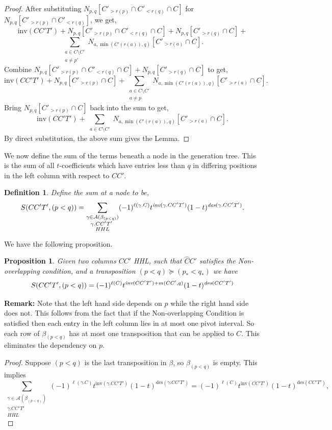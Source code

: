 \documentclass[11pt]{amsart}
\newtheorem{prop}{Proposition}[section]
\newtheorem{definition}{Definition}[section]
\begin{document}
{\begin{proof}
\newline\indent After substituting $N_{p,q}[C'_{>r(p)}\cap C'_{<r(q)}\cap C]$ for $N_{p,q}[C'_{>r(p)}\cap C'_{<r(q)}]$, we get,
\[
\text{inv}(CC'T')+N_{p,q}[C'_{>r(p)}\cap C'_{<r(q)}\cap C]+N_{p,q}[C'_{>r(q)}\cap C]+
\]
\[
\sum_{\substack{a\in C\setminus C'\\a\neq p'}}N_{a,\min(C'(r(a)),q)}[C'_{>r(a)}\cap C].
\]
Combine $N_{p,q}[C'_{>r(p)}\cap C'_{<r(q)}\cap C]+N_{p,q}[C'_{>r(q)}\cap C]$ to get, 
\[
\text{inv}(CC'T')+N_{p,q}[C'_{>r(p)}\cap C]+
\sum_{\substack{a\in C\setminus C'\\a\neq p}}N_{a,\min(C'(r(a)),q)}[C'_{>r(a)}\cap C].
\]
Bring $N_{p,q}[C'_{>r(p)}\cap C]$ back into the sum to get,
\[
\text{inv}(CC'T')+
\sum_{\substack{a\in C\setminus C'}}N_{a,\min(C'(r(a)),q)}[C'_{>r(a)}\cap C].
\]
By direct substitution, the above sum gives the Lemma.
\end{proof}
We now define the sum of the terms beneath a node in the generation tree. This is the sum of all $t$-coefficients which have entries less than $q$ in differing positions in the left column with respect to $CC'$.
\begin{definition} Define the sum at a node to be,
\[
S(CC'T',(p<q))=\sum_{\substack{\gamma \in \mathcal{A}(\beta_{(p<q)})\\ \gamma.CC'T'\text{ }\\ HHL}}(-1)^{\ell(\gamma.C)}t^{\emph{inv} (\gamma.CC'T')}(1-t)^{\emph{des}(\gamma.CC' T')}.
\]
\end{definition}
We have the following proposition. 
\begin{prop} Given two columns $CC'$ HHL, such that $\widehat{C}C'$ satisfies the Non-overlapping condition, and a transposition $(p<q)\succeq(p_{*}<q_{*})$ we have 
\[
S(CC'T',(p<q))=(-1)^{\ell(C)}t^{\emph{inv}(CC'T')+m(CC',q)}(1-t)^{\emph{des}(CC'T')}
\]
\end{prop}
\textbf{Remark: } Note that the left hand side depends on $p$ while the right hand side does not. This follows from the fact that if the Non-overlapping Condition is satisfied then each entry in the left column lies in at most one pivot interval. So each row of $\beta_{(p<q)}$ has at most one transposition that can be applied to $C$. This eliminates the dependency on $p$. 
\begin{proof}
Suppose $(p<q)$ is the last transposition in $\beta$, so $\beta_{(p<q)}$ is empty. This implies 
\[
\sum_{\substack{\gamma \in \mathcal{A}(\beta_{(p<q)})\\ \gamma.CC'T'\text{ }\\ HHL}}(-1)^{\ell(\gamma.C)}t^{\text{inv} (\gamma.CC'T')}(1-t)^{\text{des}(\gamma.CC' T')}=(-1)^{\ell(C)}t^{\text{inv} ( CC'T')}(1-t)^{\text{des}(CC' T')},
\]
\end{proof}}
\end{document}
